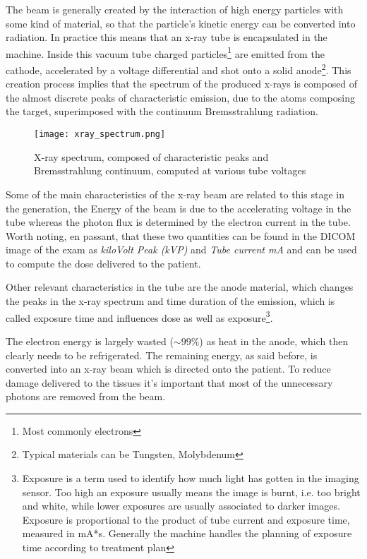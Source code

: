 The beam is generally created by the interaction of high energy particles with some kind of material, so that the particle's kinetic energy can be converted into radiation. In practice this means that an x-ray tube is encapsulated in the machine. Inside this vacuum tube charged particles\footnote{Most commonly electrons} are emitted from the cathode, accelerated by a voltage differential and shot onto a solid anode\footnote{Typical materials can be Tungsten, Molybdenum}. This creation process implies that the spectrum of the produced x-rays is composed of the almost discrete peaks of characteristic emission, due to the atoms composing the target, superimposed with the continuum Bremsstrahlung radiation.

\begin{figure}[H]
		\centering
  		\texttt{[image: xray\_spectrum.png]}
        \caption{X-ray spectrum, composed of characteristic peaks and Bremsstrahlung	continuum, computed at various tube voltages\label{fig:x-ray spectrum}}
\end{figure}

Some of the main characteristics of the x-ray beam are related to this stage in the generation, the Energy of the beam is due to the accelerating voltage in the tube  whereas the photon flux is determined by the electron current in the tube. Worth noting, en passant, that these two quantities can be found in the DICOM image of the exam as \textit{kiloVolt Peak (kVP)} and \textit{Tube current mA} and can be used to compute the dose delivered to the patient.

Other relevant characteristics in the tube are the anode material, which changes the peaks in the x-ray spectrum and time duration of the emission, which is called exposure time and influences dose as well as exposure\footnote{Exposure is a term used to identify how much light has gotten in the imaging sensor. Too high an exposure usually means the image is burnt, i.e. too bright and white, while lower exposures are usually associated to darker images. Exposure is proportional to the product of tube current and exposure time, measured in mA*s. Generally the machine handles the planning of exposure time according to treatment plan}.

The electron energy is largely wasted ($\sim 99\%$) as heat in the anode, which then clearly needs to be refrigerated. The remaining energy, as said before, is converted into an x-ray beam which is directed onto the patient. To reduce damage delivered to the tissues it's important that most of the unnecessary photons are removed from the beam.

